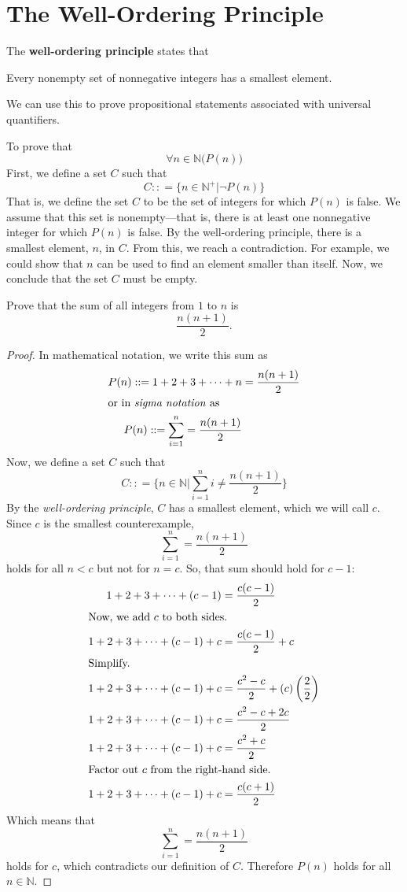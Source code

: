 \section{The Well-Ordering Principle}
The \textbf{well-ordering principle} states that
\begin{theorem}
Every nonempty set of nonnegative integers has a smallest element.
\label{thm:wellordered}
\end{theorem}
We can use this to prove propositional statements associated with universal quantifiers.

To prove that
\[ \forall n \in \mathbb N \big( P(n)\big) \]
First, we define a set $C$ such that
\[ C : : = \big\{ n \in \mathbb N^+ \big| \neg P(n) \big\} \]
That is, we define the set $C$ to be the set of integers for which $P(n)$ is false.
We assume that this set is nonempty---that is, there is at least one nonnegative integer for which $P(n)$ is false.
By the well-ordering principle, there is a smallest element, $n$, in $C$.
From this, we reach a contradiction.
For example, we could show that $n$ can be used to find an element smaller than itself.
Now, we conclude that the set $C$ must be empty.

\begin{ex}
  Prove that the sum of all integers from $1$ to $n$ is \[\frac{n(n+1)}{2}.\]
  \begin{proof}
    In mathematical notation, we write this sum as
    \begin{align*}
      P(n) : : = 1 + 2 + 3 + \cdots + n &= \frac{n(n+1)}{2} \\
      \intertext{or in \emph{sigma notation}\index{sigma notation} as }
      P(n) : : = \sum_{i=1}^n = \frac{n(n+1)}{2}
    \end{align*}
    Now, we define a set $C$ such that
    \[ C : : = \bigg\{ n \in \mathbb N \big| \sum_{i=1}^n i \neq \frac{n(n+1)}{2}\bigg\}\]
    By the \emph{well-ordering principle}, $C$ has a smallest element, which we will call $c$.
    Since $c$ is the smallest counterexample,
    \[\sum_{i=1}^n = \frac{n(n+1)}{2}\]
    holds for all $n<c$ but not for $n=c$. So, that sum should hold for $c-1$:
    \begin{align*}
      1+2+3+\cdots+(c-1)&=\frac{c(c-1)}{2}\\
      \intertext{Now, we add $c$ to both sides.}
      1+2+3+\cdots+(c-1)+c&=\frac{c(c-1)}{2}+c\\
      \intertext{Simplify.}
      1+2+3+\cdots+(c-1)+c&=\frac{c^2-c}{2}+(c)\left(\frac{2}{2}\right)\\
      1+2+3+\cdots+(c-1)+c&=\frac{c^2-c+2c}{2} \\
      1+2+3+\cdots+(c-1)+c&=\frac{c^2+c}{2} \\
      \intertext{Factor out $c$ from the right-hand side.}
      1+2+3+\cdots+(c-1)+c&=\frac{c(c+1)}{2} \\
    \end{align*}
    Which means that
    \[\sum_{i=1}^n = \frac{n(n+1)}{2}\]
    holds for $c$, which contradicts our definition of $C$. Therefore $P(n)$ holds for all  $n \in \mathbb N$.
  \end{proof}
\cite{mcsfull}
\end{ex}

